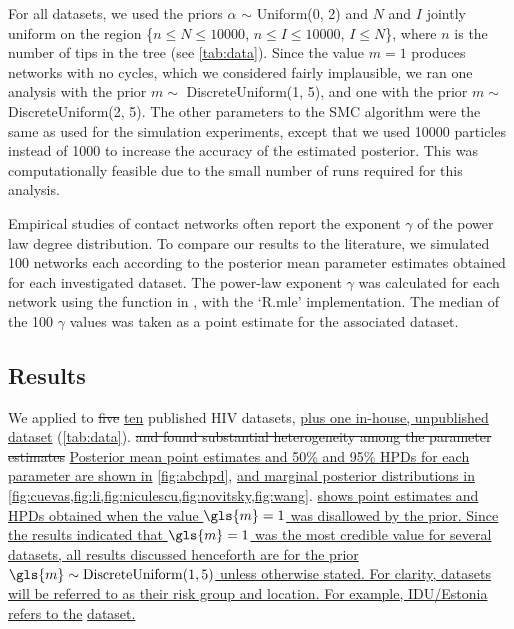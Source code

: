For all datasets, we used the priors $\alpha$ $\sim$ Uniform(0, 2) and $N$ and
$I$ jointly uniform on the region \{$n \leq N \leq 10000$, $n \leq I \leq
10000$, $I \leq N$\}, where $n$ is the number of tips in the tree (see
\cref{tab:data}). Since the value $m = 1$ produces networks with no cycles,
which we considered fairly implausible, we ran one analysis with the prior $m
\sim$ DiscreteUniform(1, 5), and one with the prior $m \sim$ DiscreteUniform(2,
5). The other parameters to the SMC algorithm were the same as used for the
simulation experiments, except that we used 10000 particles instead of 1000 to
increase the accuracy of the estimated posterior. This was computationally
feasible due to the small number of runs required for this analysis.

Empirical studies of contact networks often report the exponent $\gamma$ of the
power law degree distribution. To compare our results to the literature, we
simulated 100 networks each according to the posterior mean parameter estimates
obtained for each investigated dataset. The power-law exponent $\gamma$ was
calculated for each network using the  function in
, with the `R.mle' implementation. The median of the 100
$\gamma$ values was taken as a point estimate for the associated dataset.

\subsection{Results}



We applied  to {\color{red}\sout{five}}
{\color{blue}\uline{ten}} published HIV datasets, {\color{blue}\uline{plus
one in-house, unpublished dataset}} (\cref{tab:data}).
{\color{red}\sout{and found substantial heterogeneity among the parameter
estimates}} {\color{blue}\uline{Posterior mean point estimates and 50\% and
95\% \glspl{HPD} for each parameter are shown in} \cref{fig:abchpd}, \uline{and
marginal posterior distributions in}
\cref{fig:cuevas,fig:li,fig:niculescu,fig:novitsky,fig:wang}.
 \uline{shows point estimates and \glspl{HPD} obtained when
the value $\gls{m} = 1$ was disallowed by the prior. Since the results
indicated that $\gls{m} = 1$ was the most credible value for several datasets, 
all results discussed henceforth are for the prior $\gls{m} \sim
\DiscreteUniform(1, 5)$ unless otherwise stated. For clarity, datasets will be
referred to as their risk group and location. For example, \gls{IDU}/Estonia
refers to the} \textcite{zetterberg2004two} \uline{dataset.}}

